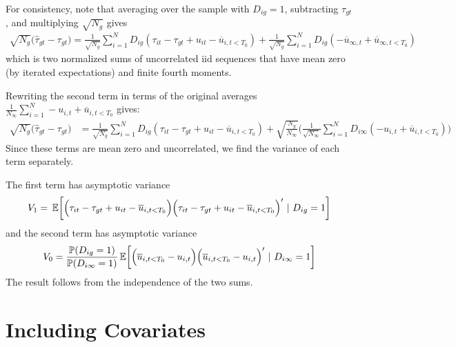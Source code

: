 \documentclass[12pt]{article}
\begin{document}
For consistency, note that averaging over the sample with $D_{ig} = 1$, subtracting $\tau_{gt}$, and multiplying $\sqrt{N_{g}}$ gives
\begin{align}
    \sqrt{N_{g}} \big( \widehat{\tau}_{gt} - \tau_{gt} \big) 
    = \frac{1}{\sqrt{N_{g}}}\sum_{i=1}^N D_{ig} (\tau_{it} - \tau_{gt} + u_{it} - \overline{u}_{i,t < T_0})
    + \frac{1}{\sqrt{N_{g}}}\sum_{i = 1}^N D_{ig} (- \overline{u}_{\infty,t} + \overline{u}_{\infty,t < T_0}) 
\end{align}
which is two normalized sums of uncorrelated iid sequences that have mean zero (by iterated expectations) and finite fourth moments. %

Rewriting the second term in terms of the original averages $\frac{1}{N_\infty} \sum_{i=1}^N - u_{i,t} + \overline{u}_{i,t < T_0}$ gives:
\begin{align}
    \sqrt{N_{g}} \big( \widehat{\tau}_{gt} - \tau_{gt} \big) 
    &= \frac{1}{\sqrt{N_{g}}}\sum_{i=1}^N D_{ig} (\tau_{it} - \tau_{gt} + u_{it} - \overline{u}_{i,t < T_0})
    + \sqrt{\frac{N_g}{N_\infty}} \bigg ( \frac{1}{\sqrt{N_\infty}} \sum_{i = 1}^N D_{i\infty} (- u_{i,t} + \overline{u}_{i,t < T_0} ) \bigg)
\end{align}
Since these terms are mean zero and uncorrelated, we find the variance of each term separately. 

The first term has asymptotic variance 
\begin{equation}
V_1 = \E{\Big( \tau_{it} - \tau_{gt} + u_{it} - \overline{u}_{i,t < T_0} \Big) \Big( \tau_{it} - \tau_{gt} + u_{it} - \overline{u}_{i,t < T_0} \Big)'}{D_{ig} = 1}
\end{equation}
and the second term has asymptotic variance
\begin{equation}
V_0 = \frac{\mathbb{P}(D_{ig} = 1)}{\mathbb{P}(D_{i\infty} = 1)} \E{ \Big( \overline{u}_{i,t < T_0} - u_{i,t} \Big) \Big( \overline{u}_{i,t < T_0} - u_{i,t} \Big)' }{D_{i\infty} = 1}
\end{equation}
The result follows from the independence of the two sums.




\section{Including Covariates}

\end{document}

